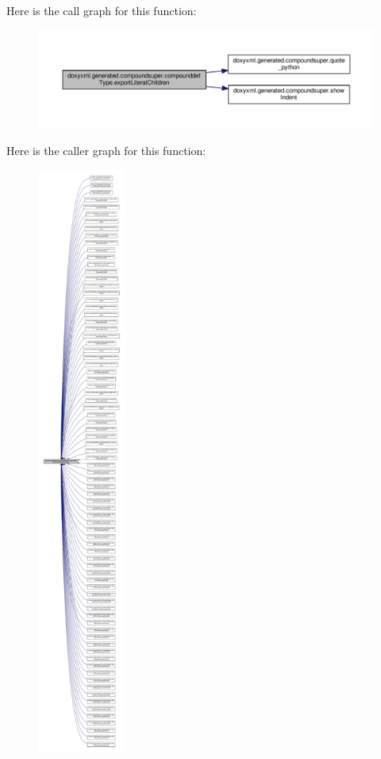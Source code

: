 Here is the call graph for this function\+:
\nopagebreak
\begin{figure}[H]
\begin{center}
\leavevmode
\includegraphics[width=350pt]{dc/d6a/classdoxyxml_1_1generated_1_1compoundsuper_1_1compounddefType_a45824cbd197faae2a91d570c5e587ff8_cgraph}
\end{center}
\end{figure}




Here is the caller graph for this function\+:
\nopagebreak
\begin{figure}[H]
\begin{center}
\leavevmode
\includegraphics[height=550pt]{dc/d6a/classdoxyxml_1_1generated_1_1compoundsuper_1_1compounddefType_a45824cbd197faae2a91d570c5e587ff8_icgraph}
\end{center}
\end{figure}


